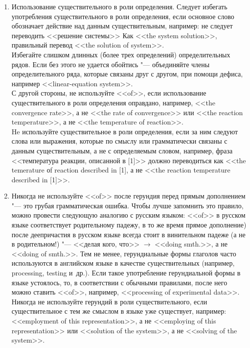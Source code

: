 \documentclass[a5paper, 10pt, twoside, numbers=enddot]{scrartcl}
\newcommand{\etal}{и~др.\xspace}
\begin{document}
\begin{enumerate}
  \item Использование существительного в роли определения. Следует избегать употребления
    существительного в роли определения, если основное слово  обозначает действие над данным
    существительным, например: не следует  переводить <<решение системы>> Как <<the system
    solution>>, правильный перевод <<the solution of system>>.\\ [4pt]
    Избегайте слишком длинных (более трех определений) определительных рядов. Если без этого не
    удается обойтись "--- объединяйте члены определительного ряда, которые связаны друг с другом,
    при помощи дефиса, например <<linear-equation system>>.\\ [4pt]
    С другой стороны, не используйте <<of>>, если использование существительного в роли определения
    оправдано, например, <<the convergence rate>>, а не <<the rate of convergence>> или <<the
    reaction temperature>>, а не <<the temperature of reaction>>.\\ [4pt]
    He используйте существительное в роли определения, если за ним следуют слова или выражения,
    которые по смыслу или грамматически связаны с данным существительным, а не с определяемым
    словом, например, фраза <<температура реакции, описанной в [1]>> должно переводиться как <<the
    temerature оf reaction described in [1], а не <<the reaction temperature described in [1]>>.

  \item Никогда не используйте <<of>> после герундия перед прямым дополнением "--- это грубая
    грамматическая ошибка. Чтобы лучше запомнить это правило, можно провести следующую аналогию с
    русским языком: <<of>> в русском языке соответствует родительному падежу, в то же время прямое
    дополнение) после деепричастия в русском языке всегда стоит в винительном падеже (а не в
    родительном!) "--- <<делая кого, что>> $\rightarrow$ <<doing smth.>>, а не <<doing of smth.>>.
    Тем не менее, герундиальные формы глаголов часто используются в английском языке в качестве
    существительных (например, processing, testing \etal). Если такое употребление герундиальной
    формы в языке устоялось, то, в  соответствии с обычными правилами, после него можно ставить
    <<of>>, например, <<processing of experimental data>>.\\ [4pt]
    Никогда не используйте герундий в роли существительного, если существительное с тем же смыслом в
    языке уже существует, например: <<employment of this representation>>, а не <<employing of this
    representation>> или <<solution of the system>>, а не <<solving of the system>>.


\end{enumerate}
\end{document}
